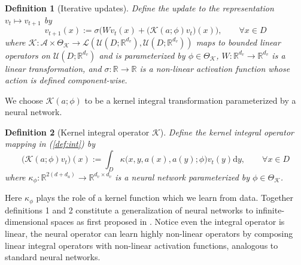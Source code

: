 \documentclass{article} %
\newcommand{\R}{\mathbb{R}}
\newcommand{\A}{\mathcal{A}}
\newcommand{\U}{\mathcal{U}}
\newcommand{\cK}{\mathcal{K}}
\newtheorem{definition}{Definition}
\begin{document}
\begin{definition}[Iterative updates]
Define the update to the representation $v_t \mapsto v_{t+1}$ by
\begin{equation}\label{def:int}
v_{t+1}(x) := \sigma\Big( W v_t(x) 
+ \bigl(\cK(a;\phi)v_t\bigr)(x) \Big), \qquad \forall x \in D
\end{equation}
where $\cK: \A \times \Theta_{\cK} \to \mathcal{L}(\U(D; \R^{d_v}),\U(D; \R^{d_v}))$ maps to bounded linear operators on $\U(D; \R^{d_v})$ and is parameterized by $\phi \in \Theta_{\cK}$, $W: \R^{d_v} \to \R^{d_v}$ is a linear transformation, and $\sigma : \R \to \R$ is a non-linear activation function whose action is defined component-wise. 
\end{definition}
We choose $\cK(a;\phi)$ to be a kernel integral transformation parameterized by a neural network.
\begin{definition}[Kernel integral operator $\cK$] 
Define the kernel integral operator mapping in (\ref{def:int}) by
\begin{equation}
\label{def:K_int}
\bigl(\cK(a;\phi)v_t\bigr)(x) :=  
\int_{D} \kappa\big(x,y,a(x),a(y);\phi\big) v_t(y) \mathrm{d}y, \qquad \forall x \in D
\end{equation}
where $\kappa_{\phi}: \R^{2(d+d_a)} \to \R^{d_v \times d_v}$ is a neural network parameterized by $\phi \in \Theta_{\cK}$.
\end{definition}
Here $\kappa_\phi$ plays the role of a kernel function which we learn from data. Together definitions 1 and 2 constitute a generalization of neural networks to infinite-dimensional spaces as first proposed in \cite{li2020neural}. Notice even the integral operator is linear, the neural operator can learn highly non-linear operators by composing linear integral operators with non-linear activation functions, analogous to standard neural networks.
\end{document}
